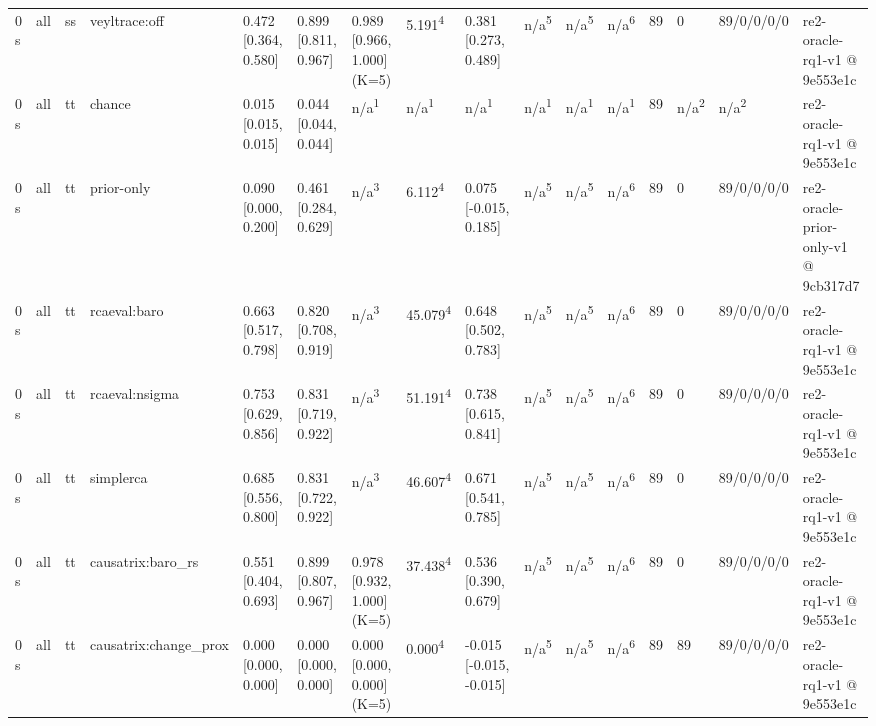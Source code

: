 \begin{table}[t]
\begin{tabular}{llllllllllllllll}
0 s & all & ss & veyltrace:off & 0.472 [0.364, 0.580] & 0.899 [0.811, 0.967] & 0.989 [0.966, 1.000] (K=5) & 5.191\textsuperscript{4} & 0.381 [0.273, 0.489] & n/a\textsuperscript{5} & n/a\textsuperscript{5} & n/a\textsuperscript{6} & 89 & 0 & 89/0/0/0/0 & re2-oracle-rq1-v1 @ 9e553e1c \\
0 s & all & tt & chance & 0.015 [0.015, 0.015] & 0.044 [0.044, 0.044] & n/a\textsuperscript{1} & n/a\textsuperscript{1} & n/a\textsuperscript{1} & n/a\textsuperscript{1} & n/a\textsuperscript{1} & n/a\textsuperscript{1} & 89 & n/a\textsuperscript{2} & n/a\textsuperscript{2} & re2-oracle-rq1-v1 @ 9e553e1c \\
0 s & all & tt & prior-only & 0.090 [0.000, 0.200] & 0.461 [0.284, 0.629] & n/a\textsuperscript{3} & 6.112\textsuperscript{4} & 0.075 [-0.015, 0.185] & n/a\textsuperscript{5} & n/a\textsuperscript{5} & n/a\textsuperscript{6} & 89 & 0 & 89/0/0/0/0 & re2-oracle-prior-only-v1 @ 9cb317d7 \\
0 s & all & tt & rcaeval:baro & 0.663 [0.517, 0.798] & 0.820 [0.708, 0.919] & n/a\textsuperscript{3} & 45.079\textsuperscript{4} & 0.648 [0.502, 0.783] & n/a\textsuperscript{5} & n/a\textsuperscript{5} & n/a\textsuperscript{6} & 89 & 0 & 89/0/0/0/0 & re2-oracle-rq1-v1 @ 9e553e1c \\
0 s & all & tt & rcaeval:nsigma & 0.753 [0.629, 0.856] & 0.831 [0.719, 0.922] & n/a\textsuperscript{3} & 51.191\textsuperscript{4} & 0.738 [0.615, 0.841] & n/a\textsuperscript{5} & n/a\textsuperscript{5} & n/a\textsuperscript{6} & 89 & 0 & 89/0/0/0/0 & re2-oracle-rq1-v1 @ 9e553e1c \\
0 s & all & tt & simplerca & 0.685 [0.556, 0.800] & 0.831 [0.722, 0.922] & n/a\textsuperscript{3} & 46.607\textsuperscript{4} & 0.671 [0.541, 0.785] & n/a\textsuperscript{5} & n/a\textsuperscript{5} & n/a\textsuperscript{6} & 89 & 0 & 89/0/0/0/0 & re2-oracle-rq1-v1 @ 9e553e1c \\
0 s & all & tt & causatrix:baro\_rs & 0.551 [0.404, 0.693] & 0.899 [0.807, 0.967] & 0.978 [0.932, 1.000] (K=5) & 37.438\textsuperscript{4} & 0.536 [0.390, 0.679] & n/a\textsuperscript{5} & n/a\textsuperscript{5} & n/a\textsuperscript{6} & 89 & 0 & 89/0/0/0/0 & re2-oracle-rq1-v1 @ 9e553e1c \\
0 s & all & tt & causatrix:change\_prox & 0.000 [0.000, 0.000] & 0.000 [0.000, 0.000] & 0.000 [0.000, 0.000] (K=5) & 0.000\textsuperscript{4} & -0.015 [-0.015, -0.015] & n/a\textsuperscript{5} & n/a\textsuperscript{5} & n/a\textsuperscript{6} & 89 & 89 & 89/0/0/0/0 & re2-oracle-rq1-v1 @ 9e553e1c \\

\end{tabular}
\end{table}
